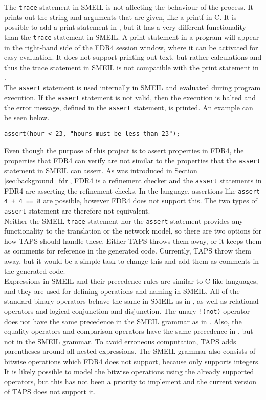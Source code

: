 The \texttt{trace} statement in SMEIL is not affecting the behaviour of the process. It prints out the string and arguments that are given, like a printf in C. It is possible to add a print statement in \cspm{}, but it has a very different functionality than the \texttt{trace} statement in SMEIL. A print statement in a \cspm{} program will appear in the right-hand side of the FDR4 session window, where it can be activated for easy evaluation. It does not support printing out text, but rather calculations and thus the trace statement in SMEIL is not compatible with the print statement in \cspm{}.\\

The \texttt{assert} statement is used internally in SMEIL and evaluated during program execution. If the \texttt{assert} statement is not valid, then the execution is halted and the error message, defined in the \texttt{assert} statement, is printed. An example can be seen below.
\begin{verbatim}
assert(hour < 23, "hours must be less than 23");
\end{verbatim}
Even though the purpose of this project is to assert properties in FDR4, the properties that FDR4 can verify are not similar to the properties that the \texttt{assert} statement in SMEIL can assert. As was introduced in Section \ref{sec:background_fdr}, FDR4 is a refinement checker and the \texttt{assert} statements in FDR4 are asserting the refinement checks. In the \cspm{} language, assertions like \texttt{assert 4 + 4 == 8} are possible, however FDR4 does not support this\cite{fdr4}. The two types of \texttt{assert} statement are therefore not equivalent.\\

Neither the SMEIL \texttt{trace} statement nor the \texttt{assert} statement provides any functionality to the translation or the network model, so there are two options for how TAPS should handle these. Either TAPS throws them away, or it keeps them as comments for reference in the generated code. Currently, TAPS throw them away, but it would be a simple task to change this and add them as comments in the generated \cspm{} code.\\

Expressions in SMEIL and their precedence rules are similar to C-like languages, and they are used for defining operations and naming in SMEIL. All of the standard binary operators behave the same in SMEIL as in \cspm{}, as well as relational operators and logical conjunction and disjunction. The unary \texttt{!(not)} operator does not have the same precedence in the SMEIL grammar as in \cspm{}. Also, the equality operators and comparison operators have the same precedence in \cspm{}, but not in the SMEIL grammar. To avoid erroneous computation, TAPS adds parentheses around all nested expressions. The SMEIL grammar also consists of bitwise operations which FDR4 does not support, because \cspm{} only supports integers. It is likely possible to model the bitwise operations using the already supported operators, but this has not been a priority to implement and the current version of TAPS does not support it.\\

